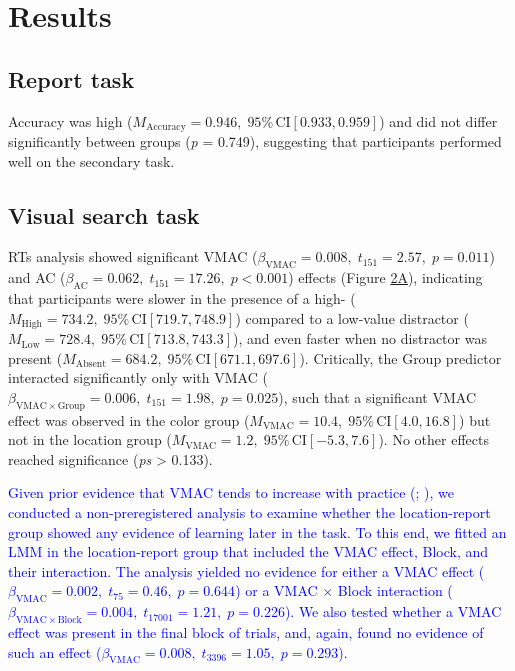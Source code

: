 \documentclass[
  man,
  floatsintext,
  longtable,
  nolmodern,
  notxfonts,
  notimes,
  mask,
  colorlinks=true,linkcolor=blue,citecolor=blue,urlcolor=blue]{apa7}
\begin{document}
\section{Results}\label{results}

\subsection{Report task}\label{report-task-1}

Accuracy was high
(\(M_{\text{Accuracy}} = 0.946, \;95\%\,\text{CI}[0.933, 0.959]\)) and
did not differ significantly between groups (\emph{p} = 0.749),
suggesting that participants performed well on the secondary task.

\subsection{Visual search task}\label{visual-search-task-1}

RTs analysis showed significant VMAC
(\(\beta_{\mathrm{VMAC}} = 0.008, \; t_{151} = 2.57, \; p = 0.011\)) and
AC (\(\beta_{\mathrm{AC}} = 0.062, \; t_{151} = 17.26, \; p < 0.001\))
effects (Figure \hyperref[fig-2]{2A}), indicating that participants were
slower in the presence of a high-
(\(M_{\mathrm{High}} = 734.2,\;95\%\,\mathrm{CI}[719.7, 748.9]\))
compared to a low-value distractor
(\(M_{\mathrm{Low}} = 728.4,\;95\%\,\mathrm{CI}[713.8, 743.3]\)), and
even faster when no distractor was present
(\(M_{\mathrm{Absent}} = 684.2,\;95\%\,\mathrm{CI}[671.1, 697.6]\)).
Critically, the Group predictor interacted significantly only with VMAC
(\(\beta_{\mathrm{VMAC} \times \mathrm{Group}} = 0.006, \; t_{151} = 1.98, \; p = 0.025\)),
such that a significant VMAC effect was observed in the color group
(\(M_{\mathrm{VMAC}} = 10.4,\;95\%\,\mathrm{CI}[4.0, 16.8]\)) but not in
the location group
(\(M_{\mathrm{VMAC}} = 1.2,\;95\%\,\mathrm{CI}[-5.3, 7.6]\)). No other
effects reached significance (\emph{ps} \textgreater{} 0.133).

\textcolor{blue}{Given prior evidence that VMAC tends to increase with
practice (;
), we conducted a
non-preregistered analysis to examine whether the location-report group
showed any evidence of learning later in the task. To this end, we
fitted an LMM in the location-report group that included the VMAC
effect, Block, and their interaction. The analysis yielded no evidence
for either a VMAC effect
(\(\beta_{\mathrm{VMAC}} = 0.002, \; t_{75} = 0.46, \; p = 0.644\)) or a
VMAC \(\times\) Block interaction
(\(\beta_{\mathrm{VMAC} \times \mathrm{Block}} = 0.004, \; t_{17001} = 1.21, \; p = 0.226\)).
We also tested whether a VMAC effect was present in the final block of
trials, and, again, found no evidence of such an effect
(\(\beta_{\mathrm{VMAC}} = 0.008, \; t_{3396} = 1.05, \; p = 0.293\)).}
\end{document}
